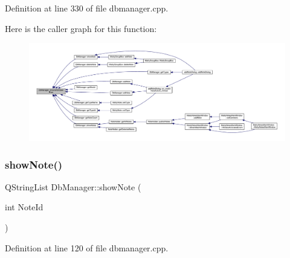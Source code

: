 Definition at line 330 of file dbmanager.\+cpp.

Here is the caller graph for this function\+:
\nopagebreak
\begin{figure}[H]
\begin{center}
\leavevmode
\includegraphics[width=350pt]{classDbManager_a2d60ab2a556cf0276bf306c7545ed03d_icgraph}
\end{center}
\end{figure}
\hypertarget{classDbManager_a51a53e4f7776ca83da7fafe7036adf17}{}\label{classDbManager_a51a53e4f7776ca83da7fafe7036adf17} 
\subsubsection{\texorpdfstring{show\+Note()}{showNote()}}
{\footnotesize\ttfamily Q\+String\+List Db\+Manager\+::show\+Note (\begin{DoxyParamCaption}\item[{int}]{Note\+Id }\end{DoxyParamCaption})\hspace{0.3cm}{\ttfamily [static]}}



Definition at line 120 of file dbmanager.\+cpp.

